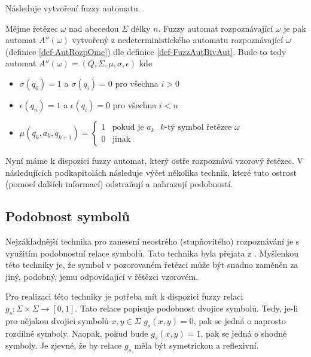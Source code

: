 \documentclass[a4paper,10pt]{article}
\begin{document}
Následuje vytvoření fuzzy automatu.

\begin{definition} \label{def-FuzzAutRozpOme}
  Mějme řetězec $\omega$ nad abecedou $\Sigma$ délky $n$. Fuzzy automat rozpoznávající $\omega$ je pak automat $A''(\omega)$ vytvořený z nedeterministického automatu rozpoznávající $\omega$ (definice \ref{def-AutRozpOme}) dle definice \ref{def-FuzzAutBivAut}. Bude to tedy automat $A''(\omega) = ( Q, \Sigma, \mu, \sigma, \epsilon )$ kde
  \begin{itemize}
   \item $\sigma(q_0) = 1$ a $\sigma(q_i) = 0$ pro všechna $i > 0$
   \item $\epsilon(q_n) = 1$ a $\epsilon(q_i) = 0$ pro všechna $i < n$
   \item $\mu(q_{k}, a_k, q_{k+1}) = 
      \begin{cases}
	1		&\text{pokud je $a_k$ $k$-tý symbol řetězce $\omega$} \\
	0		&\text{jinak}
      \end{cases}
      $
  \end{itemize}
\end{definition}

Nyní máme k dispozici fuzzy automat, který ostře rozpoznává vzorový řetězec. V následujících podkapitolách následuje výčet několika technik, které tuto ostrost (pomocí dalších informací) odstraňují a nahrazují podobností.

\subsection{Podobnost symbolů}
Nejzákladnější technika pro zanesení neostrého (stupňovitého) rozpoznávání je s využitím podobnostní relace symbolů. Tato technika byla přejata z \cite{RamGir-ConvFinAutFuzzAutStrComp}. Myšlenkou této techniky je, že symbol v pozorovaném řetězci může být snadno zaměněn za jiný, podobný, jemu odpovídající v řětězci vzorovém.

Pro realizaci této techniky je potřeba mít k dispozici fuzzy relaci $g_s: \Sigma \times \Sigma \rightarrow [0, 1]$. Tato relace popisuje podobnost dvojice symbolů. Tedy, je-li pro nějakou dvojici symbolů $x, y \in \Sigma$  $g_s(x, y) = 0$, pak se jedná o naprosto rozdílné symboly. Naopak, pokud bude $g_s(x, y) = 1$, pak se jedná o shodné symboly. Je zjevné, že by relace $g_s$ měla být symetrickou a reflexivní. 
\end{document}
